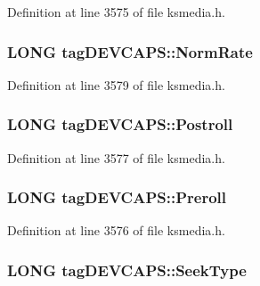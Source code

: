 Definition at line 3575 of file ksmedia.\+h.

\subsubsection[{\texorpdfstring{Norm\+Rate}{NormRate}}]{\setlength{\rightskip}{0pt plus 5cm}L\+O\+NG tag\+D\+E\+V\+C\+A\+P\+S\+::\+Norm\+Rate}\hypertarget{structtag_d_e_v_c_a_p_s_a2fa5bad968faff0b5ce48ec745ea1d63}{}\label{structtag_d_e_v_c_a_p_s_a2fa5bad968faff0b5ce48ec745ea1d63}


Definition at line 3579 of file ksmedia.\+h.

\subsubsection[{\texorpdfstring{Postroll}{Postroll}}]{\setlength{\rightskip}{0pt plus 5cm}L\+O\+NG tag\+D\+E\+V\+C\+A\+P\+S\+::\+Postroll}\hypertarget{structtag_d_e_v_c_a_p_s_a30ef6aff2fb5b84a385114da9b687dbb}{}\label{structtag_d_e_v_c_a_p_s_a30ef6aff2fb5b84a385114da9b687dbb}


Definition at line 3577 of file ksmedia.\+h.

\subsubsection[{\texorpdfstring{Preroll}{Preroll}}]{\setlength{\rightskip}{0pt plus 5cm}L\+O\+NG tag\+D\+E\+V\+C\+A\+P\+S\+::\+Preroll}\hypertarget{structtag_d_e_v_c_a_p_s_a3eff546d90ac0607bf75daf2eade6ead}{}\label{structtag_d_e_v_c_a_p_s_a3eff546d90ac0607bf75daf2eade6ead}


Definition at line 3576 of file ksmedia.\+h.

\subsubsection[{\texorpdfstring{Seek\+Type}{SeekType}}]{\setlength{\rightskip}{0pt plus 5cm}L\+O\+NG tag\+D\+E\+V\+C\+A\+P\+S\+::\+Seek\+Type}\hypertarget{structtag_d_e_v_c_a_p_s_a220899622129ffb612f9a769996bad77}{}\label{structtag_d_e_v_c_a_p_s_a220899622129ffb612f9a769996bad77}



